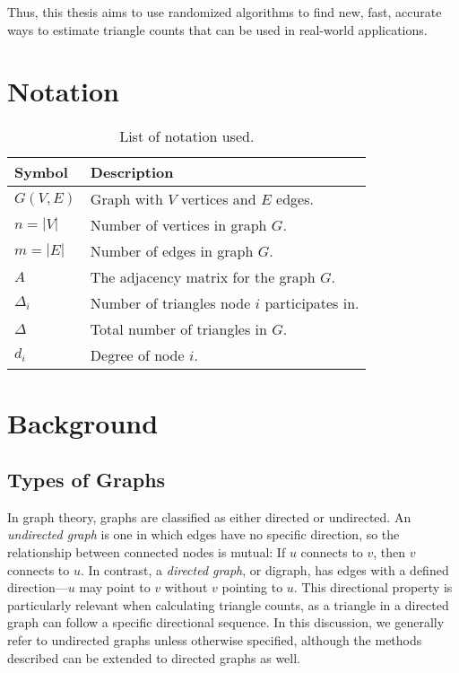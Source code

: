 \documentclass[11pt]{article}
\begin{document}
Thus, this thesis aims to use randomized algorithms to find new, fast, accurate ways to estimate triangle counts that can be used in real-world applications.

\newpage

\section{Notation}

\begin{table}[ht]
    \centering
    \caption{List of notation used.}
    \begin{tabular}{ll}
        \toprule
        \textbf{Symbol} & \textbf{Description} \\
        \midrule
        $G(V, E)$       & Graph with $V$ vertices and $E$ edges. \\
        $n = |V|$       & Number of vertices in graph $G$. \\
        $m = |E|$       & Number of edges in graph $G$. \\
        $A$             & The adjacency matrix for the graph $G$. \\
        $\Delta_i$      & Number of triangles node $i$ participates in. \\
        $\Delta$        & Total number of triangles in $G$. \\
        $d_i$           & Degree of node $i$. \\
        \bottomrule
    \end{tabular}
    \label{tab:notation}
\end{table}

\newpage

\section{Background}

\subsection{Types of Graphs}

In graph theory, graphs are classified as either directed or undirected.  
An \emph{undirected graph} is one in which edges have no specific direction, so the relationship between connected nodes is mutual: If $u$ connects to $v$, then $v$ connects to $u$.  
In contrast, a \emph{directed graph}, or digraph, has edges with a defined direction—$u$ may point to $v$ without $v$ pointing to $u$.  
This directional property is particularly relevant when calculating triangle counts, as a triangle in a directed graph can follow a specific directional sequence.  
In this discussion, we generally refer to undirected graphs unless otherwise specified, although the methods described can be extended to directed graphs as well.
\end{document}
